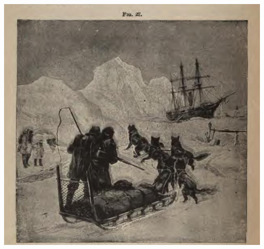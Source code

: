 \documentclass[notitlepage]{article}
\begin{document}
\begin{multicols}{2}
{\centering
\includegraphics[width=\columnwidth]{arctic-sledders}
}


\end{multicols}
\end{document}
